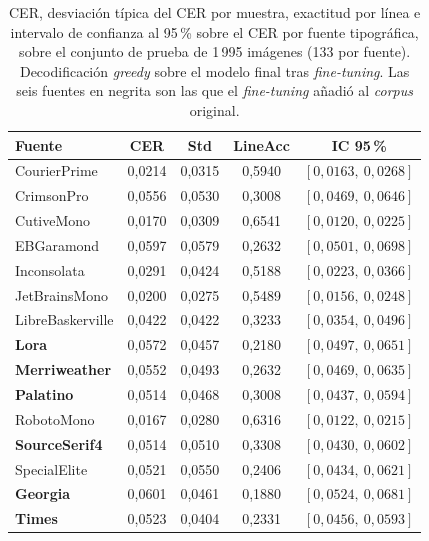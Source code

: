 \begin{table}[!htbp]
	\centering
	\caption{CER, desviación típica del CER por muestra, exactitud por línea e intervalo de confianza al 95\,\% sobre el CER por fuente tipográfica, sobre el conjunto de prueba de 1\,995 imágenes (133 por fuente). Decodificación \textit{greedy} sobre el modelo final tras \textit{fine-tuning}. Las seis fuentes en negrita son las que el \textit{fine-tuning} añadió al \textit{corpus} original.}
	\label{tab:test-por-fuente}
	\begin{tabular}{lcccc}
		\toprule
		\textbf{Fuente} & \textbf{CER} & \textbf{Std} & \textbf{LineAcc} & \textbf{IC 95\,\%} \\
		\midrule
		CourierPrime          & 0,0214 & 0,0315 & 0,5940 & $[0{,}0163,\ 0{,}0268]$ \\
		CrimsonPro            & 0,0556 & 0,0530 & 0,3008 & $[0{,}0469,\ 0{,}0646]$ \\
		CutiveMono            & 0,0170 & 0,0309 & 0,6541 & $[0{,}0120,\ 0{,}0225]$ \\
		EBGaramond            & 0,0597 & 0,0579 & 0,2632 & $[0{,}0501,\ 0{,}0698]$ \\
		Inconsolata           & 0,0291 & 0,0424 & 0,5188 & $[0{,}0223,\ 0{,}0366]$ \\
		JetBrainsMono         & 0,0200 & 0,0275 & 0,5489 & $[0{,}0156,\ 0{,}0248]$ \\
		LibreBaskerville      & 0,0422 & 0,0422 & 0,3233 & $[0{,}0354,\ 0{,}0496]$ \\
		\textbf{Lora}         & 0,0572 & 0,0457 & 0,2180 & $[0{,}0497,\ 0{,}0651]$ \\
		\textbf{Merriweather} & 0,0552 & 0,0493 & 0,2632 & $[0{,}0469,\ 0{,}0635]$ \\
		\textbf{Palatino}     & 0,0514 & 0,0468 & 0,3008 & $[0{,}0437,\ 0{,}0594]$ \\
		RobotoMono            & 0,0167 & 0,0280 & 0,6316 & $[0{,}0122,\ 0{,}0215]$ \\
		\textbf{SourceSerif4} & 0,0514 & 0,0510 & 0,3308 & $[0{,}0430,\ 0{,}0602]$ \\
		SpecialElite          & 0,0521 & 0,0550 & 0,2406 & $[0{,}0434,\ 0{,}0621]$ \\
		\textbf{Georgia}      & 0,0601 & 0,0461 & 0,1880 & $[0{,}0524,\ 0{,}0681]$ \\
		\textbf{Times}        & 0,0523 & 0,0404 & 0,2331 & $[0{,}0456,\ 0{,}0593]$ \\
		\bottomrule
	\end{tabular}
\end{table}

